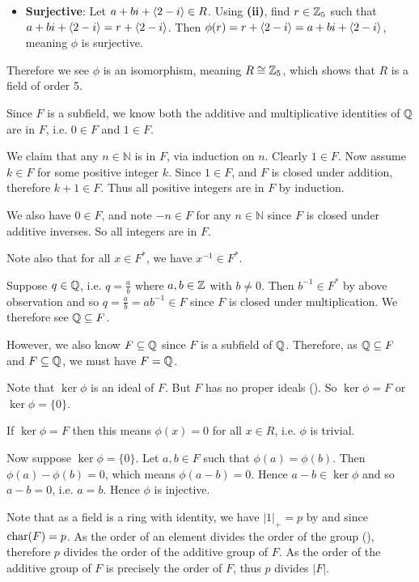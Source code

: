 \begin{questions}
\begin{partquestions}{\roman*}
\begin{itemize}
            \item \textbf{Surjective}: Let $a+bi + \left\langle2-i\right\rangle \in R$. Using \textbf{(ii)}, find $r \in \mathbb{Z}_5$ such that $a+bi + \left\langle2-i\right\rangle = r + \left\langle2-i\right\rangle$. Then $\phi(r) = r + \left\langle2-i\right\rangle = a+bi + \left\langle2-i\right\rangle$, meaning $\phi$ is surjective.
        \end{itemize}
        Therefore we see $\phi$ is an isomorphism, meaning $R \cong \mathbb{Z}_5$, which shows that $R$ is a field of order 5.
    \end{partquestions}

    \item Since $F$ is a subfield, we know both the additive and multiplicative identities of $\mathbb{Q}$ are in $F$, i.e. $0 \in F$ and $1 \in F$.

    We claim that any $n \in \mathbb{N}$ is in $F$, via induction on $n$. Clearly $1 \in F$. Now assume $k \in F$ for some positive integer $k$. Since $1 \in F$, and $F$ is closed under addition, therefore $k + 1 \in F$. Thus all positive integers are in $F$ by induction.
    
    We also have $0 \in F$, and note $-n \in F$ for any $n \in \mathbb{N}$ since $F$ is closed under additive inverses. So all integers are in $F$.

    Note also that for all $x \in F^\ast$, we have $x^{-1} \in F^\ast$.

    Suppose $q \in \mathbb{Q}$, i.e. $q = \frac ab$ where $a, b \in \mathbb{Z}$ with $b \neq 0$. Then $b^{-1} \in F^\ast$ by above observation and so $q = \frac ab = ab^{-1} \in F$ since $F$ is closed under multiplication. We therefore see $\mathbb{Q} \subseteq F$.

    However, we also know $F \subseteq \mathbb{Q}$ since $F$ is a subfield of $\mathbb{Q}$. Therefore, as $\mathbb{Q} \subseteq F$ and $F \subseteq \mathbb{Q}$, we must have $F = \mathbb{Q}$.

    \item Note that $\ker\phi$ is an ideal of $F$. But $F$ has no proper ideals (). So $\ker\phi = F$ or $\ker\phi = \{0\}$.

    If $\ker\phi = F$ then this means $\phi(x) = 0$ for all $x\in R$, i.e. $\phi$ is trivial.

    Now suppose $\ker\phi = \{0\}$. Let $a, b \in F$ such that $\phi(a) = \phi(b)$. Then $\phi(a) - \phi(b) = 0$, which means $\phi(a - b) = 0$. Hence $a - b \in \ker\phi$ and so $a - b = 0$, i.e. $a = b$. Hence $\phi$ is injective.

    \item \begin{partquestions}{\roman*}
        \item Note that as a field is a ring with identity, we have $|1|_+ = p$ by  and since $\mathrm{char}(F) = p$. As the order of an element divides the order of the group (), therefore $p$ divides the order of the additive group of $F$. As the order of the additive group of $F$ is precisely the order of $F$, thus $p$ divides $|F|$.


\end{partquestions}
\end{questions}
